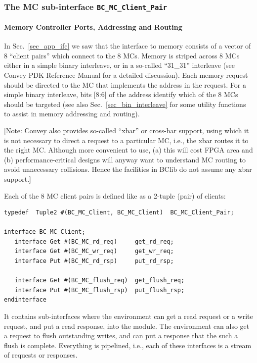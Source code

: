 \documentclass[twoside,letterpaper,11pt]{article}
\newcommand{\hm}{\hspace*{1em}}
\begin{document}

\subsubsection{The MC sub-interface {\tt BC\_MC\_Client\_Pair}}


\paragraph{Memory Controller Ports, Addressing and Routing}
\hm

\label{sec_mc_port}

In Sec.~\ref{sec_app_ifc} we saw that the interface to memory consists
of a vector of 8 ``client pairs'' which connect to the 8 MCs.  Memory
is striped across 8 MCs either in a simple binary interleave, or in a
so-called ``31\_31'' interleave (see Convey PDK Reference Manual for a
detailed discussion).  Each memory request should be directed to the
MC that implements the address in the request.  For a simple binary
interleave, bits [8:6] of the address identify which of the 8 MCs
should be targeted (see also Sec.~\ref{sec_bin_interleave} for some
utility functions to assist in memory addressing and routing).

[Note: Convey also provides so-called ``xbar'' or cross-bar support,
using which it is not necessary to direct a request to a particular
MC, i.e., the xbar routes it to the right MC.  Although more
convenient to use, (a) this will cost FPGA area and (b)
performance-critical designs will anyway want to understand MC routing
to avoid unnecessary collisions.  Hence the facilities in BClib do not
assume any xbar support.]

Each of the 8 MC client pairs is defined like as a 2-tuple (pair) of clients:
\begin{Verbatim}[frame=single, label=BC\_HW\_IFC.bsv]
typedef  Tuple2 #(BC_MC_Client, BC_MC_Client)  BC_MC_Client_Pair;

interface BC_MC_Client;
   interface Get #(BC_MC_rd_req)     get_rd_req;
   interface Get #(BC_MC_wr_req)     get_wr_req;
   interface Put #(BC_MC_rd_rsp)     put_rd_rsp;

   interface Get #(BC_MC_flush_req)  get_flush_req;
   interface Put #(BC_MC_flush_rsp)  put_flush_rsp;
endinterface
\end{Verbatim}
It contains sub-interfaces where the environment can get a read
request or a write request, and put a read response, into the module.
The environment can also get a request to flush outstanding writes,
and can put a response that the such a flush is complete.  Everything
is pipelined, i.e., each of these interfaces is a stream of requests
or responses.
\end{document}
